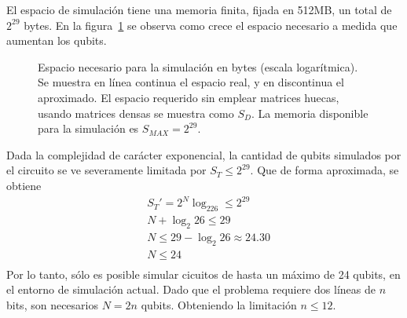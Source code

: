 El espacio de simulación tiene una memoria finita, fijada en 512MB, un total de 
$2^{29}$ bytes. En la figura~\ref{fig:espacio-qc} se observa como crece el 
espacio necesario a medida que aumentan los qubits.
%
\begin{figure}[!htb]
\centering
{}
\caption{Espacio necesario para la simulación en bytes (escala logarítmica). Se
muestra en línea continua el espacio real, y en discontinua el aproximado. El 
espacio requerido sin emplear matrices huecas, usando matrices densas se muestra 
como $S_D$. La memoria disponible para la simulación es $S_{MAX} = 2^{29}$.}
\label{fig:espacio-qc}
\end{figure}
%
Dada la complejidad de carácter exponencial, la cantidad de qubits simulados por 
el circuito se ve severamente limitada por $S_T \leq 2^{29}$. Que de forma 
aproximada, se obtiene
\begin{equation*}
\begin{split}
&S_T' = 2^N \log_226 \leq 2^{29} \\
&N + \log_2 26 \leq 29 \\
&N \leq 29 - \log_2 26 \approx 24.30 \\
&N \leq 24 \\
\end{split}
\end{equation*}
Por lo tanto, sólo es posible simular cicuitos de hasta un máximo de 24 qubits, 
en el entorno de simulación actual. Dado que el problema requiere dos líneas de 
$n$ bits, son necesarios $N = 2n$ qubits. Obteniendo la limitación $n \leq 12$.


